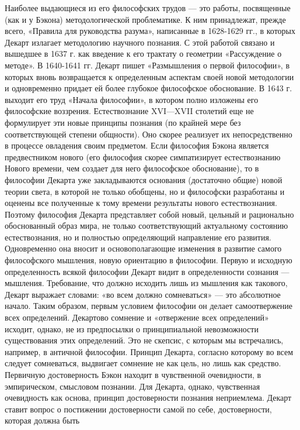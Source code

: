 \documentclass[12pt]{article}
\begin{document}
Наиболее  выдающиеся  из  его  философских  трудов  ---  это  работы,  посвященные  (как  и  у  Бэкона)
методологической  проблематике.  К  ним  принадлежат,  прежде  всего,  «Правила  для  руководства  разума»,
написанные в 1628-1629 гг., в которых Декарт излагает методологию научного познания. С этой работой
связано и вышедшее в 1637 г. как введение к его трактату о геометрии «Рассуждение о методе». В 1640-1641
гг.  Декарт  пишет  «Размышления  о  первой  философии»,  в  которых  вновь  возвращается  к  определенным
аспектам своей новой методологии и одновременно придает ей более глубокое философское обоснование. В
1643 г. выходит его труд «Начала философии», в котором полно изложены его философские воззрения.
Естествознание XVI—XVII столетий еще не формулирует эти новые принципы познания (по крайней мере без
соответствующей степени общности). Оно скорее реализует их непосредственно в процессе овладения своим
предметом. Если философия  Бэкона является  предвестником  нового (его  философия скорее  симпатизирует
естествознанию Нового времени, чем создает для него философское обоснование), то в философии Декарта уже
закладываются  основания  (достаточно  общие)  новой  теории  света,  в  которой  не  только  обобщены,  но  и
философски  разработаны  и  оценены  все  полученные  к  тому  времени  результаты  нового  естествознания.
Поэтому философия Декарта представляет собой новый, цельный и рационально обоснованный образ мира, не
только соответствующий актуальному состоянию естествознания, но и полностью определяющий направление
его развития. Одновременно она вносит  и основополагающие  изменения в развитие  самого философского
мышления, новую ориентацию в философии.
Первую и исходную определенность всякой философии Декарт видит в определенности сознания --- мышления.
Требование, что должно исходить лишь из мышления как такового, Декарт выражает словами: «во всем должно
сомневаться» --- это абсолютное начало. Таким образом, первым условием философии он делает самоотвержение всех определений.
Декартово сомнение и «отвержение всех определений» исходит, однако, не из предпосылки о принципиальной
невозможности существования этих определений. Это не скепсис, с которым мы встречались, например, в
античной философии. Принцип Декарта, согласно которому во всем следует сомневаться, выдвигает сомнение
не как цель, но лишь как средство.
Первичную достоверность Бэкон находит в чувственной очевидности, в эмпирическом, смысловом познании.
Для Декарта, однако, чувственная очевидность как основа, принцип достоверности познания неприемлема.
Декарт  ставит  вопрос  о  постижении  достоверности  самой  по  себе,  достоверности,  которая  должна  быть
\end{document}
